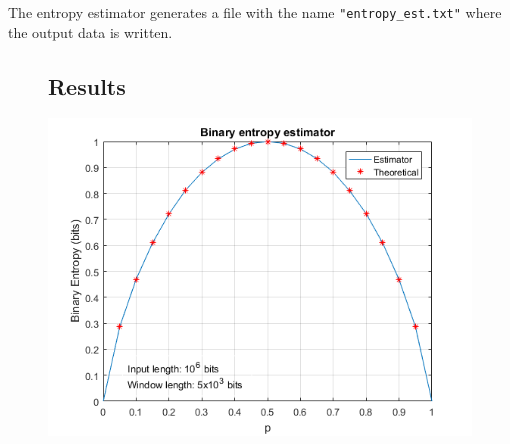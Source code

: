 The entropy estimator generates a file with the name \texttt{"entropy\_est.txt"} where the output data is written.

\begin{figure}[H]
\subsection*{Results}
    \centerline{
       \includegraphics[scale=0.75]{./lib/entropy_estimator/figures/BinEntropyResults.png}
    }
\end{figure}

